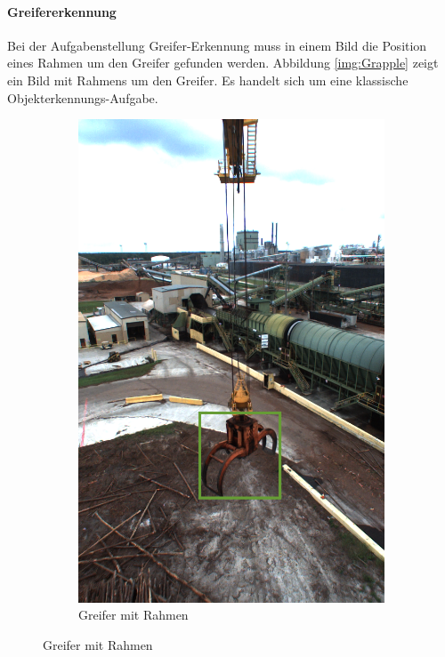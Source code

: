 	\paragraph{Greifererkennung} Bei der Aufgabenstellung Greifer-Erkennung muss in einem Bild die Position eines Rahmen um den Greifer gefunden werden. Abbildung \ref{img:Grapple} zeigt ein Bild mit Rahmens um den Greifer. Es handelt sich um eine klassische Objekterkennungs-Aufgabe.
	\begin{figure}[h]
		\centering
		\begin{subfigure}[c]{0.49\textwidth}			
			\includegraphics[width=1\textwidth, center]{bilder/Grundlagen/Grapple_8.png}
			\caption[Bsp. Bild: Greifer mit Rahmen]{Greifer mit Rahmen}

\end{subfigure}
\end{figure}
